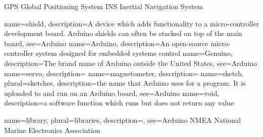 %
%

{GPS}
{Global Positioning System}
{INS}
{Inertial Navigation System}

{name=shield,
description={A device which adds functionality to a micro-controller development board. Arduino shields can often be stacked on top of the main board},
see={Arduino}
}
{name=Arduino,
description={An open-source micro-controller system designed for embedded systems control}
}
{name=Genuino,
description={The brand name of Arduino outside the United States},
see={Arduino}
}
{name=servo,
description={}
}
{name=magnetometer,
description={}
}
{name=sketch,
plural={sketches},
description={the name that Arduino uses for a program. It is uploaded to and run on an Arduino board},
see={Arduino}
}
{name=void,
description={a software function which runs but does not return any value}
}

{name=library,
plural={libraries},
description={},
see={Arduino}
}
{NMEA}
{National Marine Electronics Association}
